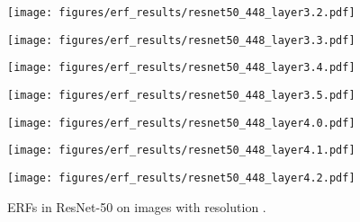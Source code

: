 \documentclass{article}
\begin{document}
\begin{figure}[tb]
\begin{minipage}[t]{0.13\hsize}
    \label{figure:erf_resnet_448:8}
  \end{minipage}
  \begin{minipage}[t]{0.13\hsize}
    \centering
    \texttt{[image: figures/erf\_results/resnet50\_448\_layer3.2.pdf]}
    \label{figure:erf_resnet_448:9}
  \end{minipage}
  \begin{minipage}[t]{0.13\hsize}
    \centering
    \texttt{[image: figures/erf\_results/resnet50\_448\_layer3.3.pdf]}
    \label{figure:erf_resnet_448:10}
  \end{minipage}
  \begin{minipage}[t]{0.13\hsize}
    \centering
    \texttt{[image: figures/erf\_results/resnet50\_448\_layer3.4.pdf]}
    \label{figure:erf_resnet_448:11}
  \end{minipage}
  \begin{minipage}[t]{0.13\hsize}
    \centering
    \texttt{[image: figures/erf\_results/resnet50\_448\_layer3.5.pdf]}
    \label{figure:erf_resnet_448:12}
  \end{minipage}
  \begin{minipage}[t]{0.13\hsize}
    \centering
    \texttt{[image: figures/erf\_results/resnet50\_448\_layer4.0.pdf]}
    \label{figure:erf_resnet_448:13}
  \end{minipage}
  \begin{minipage}[t]{0.13\hsize}
    \centering
    \texttt{[image: figures/erf\_results/resnet50\_448\_layer4.1.pdf]}
    \label{figure:erf_resnet_448:14}
  \end{minipage}
  \begin{minipage}[t]{0.13\hsize}
    \centering
    \texttt{[image: figures/erf\_results/resnet50\_448\_layer4.2.pdf]}
    \label{figure:erf_resnet_448:15}
  \end{minipage}
  \caption{ERFs in ResNet-50 \cite{he2016deep} on images with resolution .}
  \label{figure:erf_resnet_448}
\end{figure} 
\end{document}
